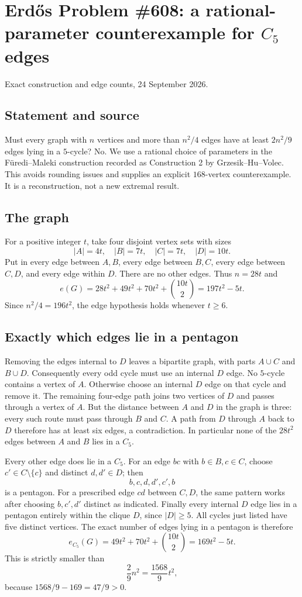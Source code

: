 \section{Erd\H{o}s Problem \#608: a rational-parameter counterexample for $C_5$ edges}
\noindent Exact construction and edge counts, 24 September 2026.

\subsection*{Statement and source}
Must every graph with $n$ vertices and more than $n^2/4$ edges have at least $2n^2/9$ edges lying in a $5$-cycle? No. We use a rational choice of parameters in the F\"uredi--Maleki construction recorded as Construction 2 by Grzesik--Hu--Volec. This avoids rounding issues and supplies an explicit $168$-vertex counterexample. It is a reconstruction, not a new extremal result.

\subsection*{The graph}
For a positive integer $t$, take four disjoint vertex sets with sizes
\[|A|=4t,\quad |B|=7t,\quad |C|=7t,\quad |D|=10t.
\]
Put in every edge between $A,B$, every edge between $B,C$, every edge between $C,D$, and every edge within $D$. There are no other edges. Thus $n=28t$ and
\[
e(G)=28t^2+49t^2+70t^2+\binom{10t}{2}
=197t^2-5t.
\]
Since $n^2/4=196t^2$, the edge hypothesis holds whenever $t\geq6$.

\subsection*{Exactly which edges lie in a pentagon}
Removing the edges internal to $D$ leaves a bipartite graph, with parts $A\cup C$ and $B\cup D$. Consequently every odd cycle must use an internal $D$ edge.
No $5$-cycle contains a vertex of $A$. Otherwise choose an internal $D$ edge on that cycle and remove it. The remaining four-edge path joins two vertices of $D$ and passes through a vertex of $A$. But the distance between $A$ and $D$ in the graph is three: every such route must pass through $B$ and $C$. A path from $D$ through $A$ back to $D$ therefore has at least six edges, a contradiction. In particular none of the $28t^2$ edges between $A$ and $B$ lies in a $C_5$.

Every other edge does lie in a $C_5$. For an edge $bc$ with $b\in B,c\in C$, choose $c'\in C\setminus\{c\}$ and distinct $d,d'\in D$; then
\[b,c,d,d',c',b
\]
is a pentagon. For a prescribed edge $cd$ between $C,D$, the same pattern works after choosing $b,c',d'$ distinct as indicated. Finally every internal $D$ edge lies in a pentagon entirely within the clique $D$, since $|D|\geq5$. All cycles just listed have five distinct vertices.
The exact number of edges lying in a pentagon is therefore
\[e_{C_5}(G)=49t^2+70t^2+\binom{10t}{2}=169t^2-5t.
\]
This is strictly smaller than
\[\frac29n^2=\frac{1568}{9}t^2,
\]
because $1568/9-169=47/9>0$.

